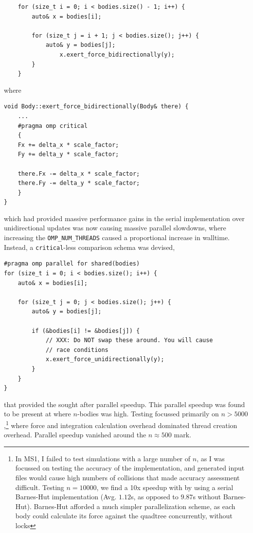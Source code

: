 \documentclass[11pt,a4paper]{article}
\begin{document}
\begin{verbatim}
    for (size_t i = 0; i < bodies.size() - 1; i++) {
        auto& x = bodies[i];
        
        for (size_t j = i + 1; j < bodies.size(); j++) {
            auto& y = bodies[j];
                x.exert_force_bidirectionally(y);
        }
    }
\end{verbatim}

where 

\begin{verbatim}
void Body::exert_force_bidirectionally(Body& there) {
    ...
    #pragma omp critical
    {
    Fx += delta_x * scale_factor;
    Fy += delta_y * scale_factor;

    there.Fx -= delta_x * scale_factor;
    there.Fy -= delta_y * scale_factor;
    }
}
\end{verbatim}

which had provided massive performance gains in the serial implementation over unidirectional updates was now causing massive parallel slowdowns, where increasing the \texttt{OMP\_NUM\_THREADS} caused a proportional increase in walltime. Instead, a \texttt{critical}-less comparison schema was devised, 

\begin{verbatim}
#pragma omp parallel for shared(bodies)
for (size_t i = 0; i < bodies.size(); i++) {
    auto& x = bodies[i];

    for (size_t j = 0; j < bodies.size(); j++) {
        auto& y = bodies[j];

        if (&bodies[i] != &bodies[j]) {
            // XXX: Do NOT swap these around. You will cause
            // race conditions
            x.exert_force_unidirectionally(y);
        }
    }
}
\end{verbatim}

that provided the sought after parallel speedup. This parallel speedup was found to be present at where $n$-bodies was high. Testing focussed primarily on $n > 5000$,\footnote{In MS1, I failed to test simulations with a large number of $n$, as I was focussed on testing the accuracy of the implementation, and generated input files would cause high numbers of collisions that made accuracy assessment difficult. Testing $n=10000$, we find a 10x speedup with by using a serial Barnes-Hut implementation (Avg. $1.12$s, as opposed to $9.87$s without Barnes-Hut). Barnes-Hut afforded a much simpler parallelization scheme, as each body could calculate its force against the quadtree concurrently, without locks} where force and integration calculation overhead dominated thread creation overhead. Parallel speedup vanished around the $n \approx 500$ mark.
\end{document}
